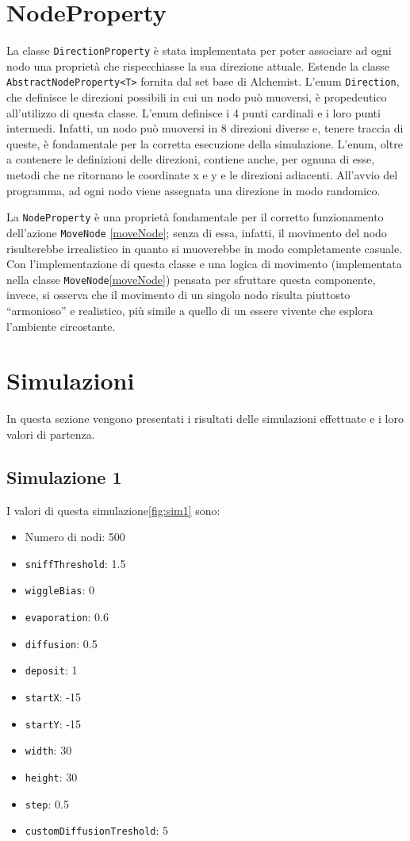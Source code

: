 \section{NodeProperty}
La classe \texttt{DirectionProperty} è stata implementata per poter associare ad ogni nodo una proprietà che rispecchiasse la sua direzione attuale.
Estende la classe \texttt{AbstractNodeProperty<T>} fornita dal set base di Alchemist.
L'enum \texttt{Direction}, che definisce le direzioni possibili in cui un nodo può muoversi, è propedeutico all'utilizzo di questa classe.
L'enum definisce i 4 punti cardinali e i loro punti intermedi. Infatti, un nodo può muoversi in 8 direzioni diverse e, tenere traccia di
queste, è fondamentale per la corretta esecuzione della simulazione. L'enum, oltre a contenere le definizioni delle direzioni, contiene anche,
per ognuna di esse, metodi che ne ritornano le coordinate x e y e le direzioni adiacenti. All'avvio del programma, ad ogni nodo 
viene assegnata una direzione in modo randomico. 

La \texttt{NodeProperty} è una proprietà fondamentale per il corretto funzionamento dell'azione \texttt{MoveNode}
\space\ref{moveNode}; senza di essa, infatti, il movimento del nodo risulterebbe irrealistico in quanto si muoverebbe in modo completamente casuale.
Con l'implementazione di questa classe e una logica di movimento (implementata nella classe \texttt{MoveNode}\space\ref{moveNode})
pensata per sfruttare questa componente, invece,
si osserva che il movimento di un singolo nodo risulta piuttosto ``armonioso'' e realistico, più simile a quello di un essere vivente che 
esplora l'ambiente circostante.

\section{Simulazioni}
In questa sezione vengono presentati i risultati delle simulazioni effettuate e i loro valori di partenza.

\subsection{Simulazione 1}
I valori di questa simulazione\space \cref{fig:sim1} sono:
\begin{itemize}
    \item Numero di nodi: 500
    \item \texttt{sniffThreshold}: 1.5
    \item \texttt{wiggleBias}: 0
    \item \texttt{evaporation}: 0.6
    \item \texttt{diffusion}: 0.5
    \item \texttt{deposit}: 1
    \item \texttt{startX}: -15
    \item \texttt{startY}: -15
    \item \texttt{width}: 30
    \item \texttt{height}: 30
    \item \texttt{step}: 0.5
    \item \texttt{customDiffusionTreshold}: 5
\end{itemize}
